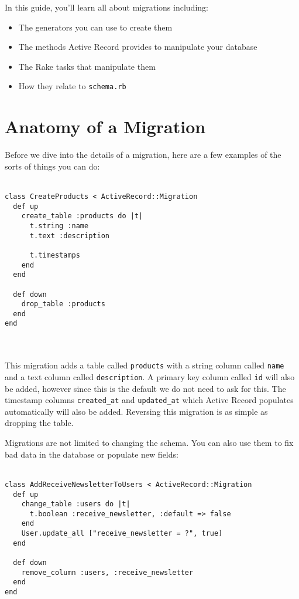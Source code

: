 \documentclass[10pt]{book}
\begin{document}
In this guide, you’ll learn all about migrations including:
\begin{itemize}
	\item The generators you can use to create them
	\item The methods Active Record provides to manipulate your database
	\item The Rake tasks that manipulate them
	\item How they relate to \texttt{schema.rb}
\end{itemize}

\newpage

\section{ Anatomy of a Migration}
Before we dive into the details of a migration, here are a few examples of the sorts of things you can do:
\\ \\
\begin{minipage}{\textwidth}
\begin{verbatim}
class CreateProducts < ActiveRecord::Migration
  def up
    create_table :products do |t|
      t.string :name
      t.text :description

      t.timestamps
    end
  end

  def down
    drop_table :products
  end
end
\end{verbatim}
\end{minipage}
\\ \\


This migration adds a table called \texttt{products} with a string column called \texttt{name} and a text column called \texttt{description}. A primary key column called \texttt{id} will also be added, however since this is the default we do not need to ask for this. The timestamp columns \texttt{created\_at} and \texttt{updated\_at} which Active Record populates automatically will also be added. Reversing this migration is as simple as dropping the table.

Migrations are not limited to changing the schema. You can also use them to fix bad data in the database or populate new fields:
\\ \\
\begin{minipage}{\textwidth}
\begin{verbatim}
class AddReceiveNewsletterToUsers < ActiveRecord::Migration
  def up
    change_table :users do |t|
      t.boolean :receive_newsletter, :default => false
    end
    User.update_all ["receive_newsletter = ?", true]
  end
 
  def down
    remove_column :users, :receive_newsletter
  end
end
\end{verbatim}
\end{minipage}
\\ \\
\end{document}
